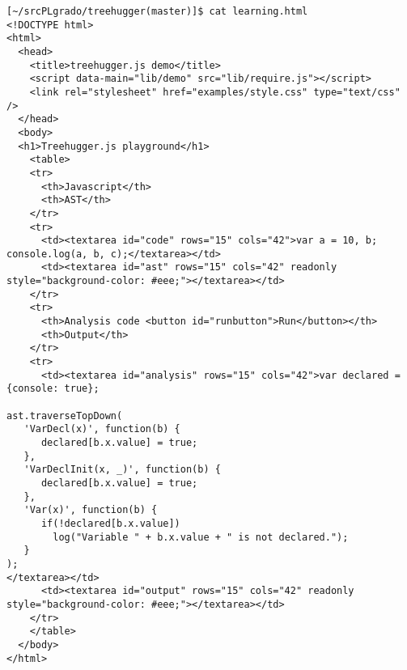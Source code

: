 \begin{verbatim}
[~/srcPLgrado/treehugger(master)]$ cat learning.html 
<!DOCTYPE html>
<html>
  <head>
    <title>treehugger.js demo</title>
    <script data-main="lib/demo" src="lib/require.js"></script>
    <link rel="stylesheet" href="examples/style.css" type="text/css" />
  </head>
  <body>
  <h1>Treehugger.js playground</h1>
    <table>
    <tr>
      <th>Javascript</th>
      <th>AST</th>
    </tr>
    <tr>
      <td><textarea id="code" rows="15" cols="42">var a = 10, b;
console.log(a, b, c);</textarea></td>
      <td><textarea id="ast" rows="15" cols="42" readonly style="background-color: #eee;"></textarea></td>
    </tr>
    <tr>
      <th>Analysis code <button id="runbutton">Run</button></th>
      <th>Output</th>
    </tr>
    <tr>
      <td><textarea id="analysis" rows="15" cols="42">var declared = {console: true};

ast.traverseTopDown(
   'VarDecl(x)', function(b) {
      declared[b.x.value] = true;
   },
   'VarDeclInit(x, _)', function(b) {
      declared[b.x.value] = true;
   },
   'Var(x)', function(b) {
      if(!declared[b.x.value])
        log("Variable " + b.x.value + " is not declared.");
   }
);
</textarea></td>
      <td><textarea id="output" rows="15" cols="42" readonly style="background-color: #eee;"></textarea></td>
    </tr>
    </table>
  </body>
</html>
\end{verbatim}


